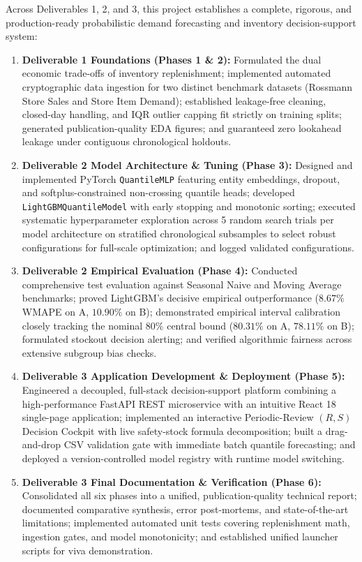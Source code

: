 \documentclass[11pt,a4paper]{article}
\begin{document}
Across Deliverables 1, 2, and 3, this project establishes a complete, rigorous, and production-ready probabilistic demand forecasting and inventory decision-support system:
\begin{enumerate}
    \item \textbf{Deliverable 1 Foundations (Phases 1 \& 2):} Formulated the dual economic trade-offs of inventory replenishment; implemented automated cryptographic data ingestion for two distinct benchmark datasets (Rossmann Store Sales and Store Item Demand); established leakage-free cleaning, closed-day handling, and IQR outlier capping fit strictly on training splits; generated publication-quality EDA figures; and guaranteed zero lookahead leakage under contiguous chronological holdouts.
    \item \textbf{Deliverable 2 Model Architecture \& Tuning (Phase 3):} Designed and implemented PyTorch \texttt{QuantileMLP} featuring entity embeddings, dropout, and softplus-constrained non-crossing quantile heads; developed \texttt{LightGBMQuantileModel} with early stopping and monotonic sorting; executed systematic hyperparameter exploration across 5 random search trials per model architecture on stratified chronological subsamples to select robust configurations for full-scale optimization; and logged validated configurations.
    \item \textbf{Deliverable 2 Empirical Evaluation (Phase 4):} Conducted comprehensive test evaluation against Seasonal Naive and Moving Average benchmarks; proved LightGBM's decisive empirical outperformance ($8.67\%$ WMAPE on A, $10.90\%$ on B); demonstrated empirical interval calibration closely tracking the nominal 80\% central bound ($80.31\%$ on A, $78.11\%$ on B); formulated stockout decision alerting; and verified algorithmic fairness across extensive subgroup bias checks.
    \item \textbf{Deliverable 3 Application Development \& Deployment (Phase 5):} Engineered a decoupled, full-stack decision-support platform combining a high-performance FastAPI REST microservice with an intuitive React 18 single-page application; implemented an interactive Periodic-Review $(R, S)$ Decision Cockpit with live safety-stock formula decomposition; built a drag-and-drop CSV validation gate with immediate batch quantile forecasting; and deployed a version-controlled model registry with runtime model switching.
    \item \textbf{Deliverable 3 Final Documentation \& Verification (Phase 6):} Consolidated all six phases into a unified, publication-quality technical report; documented comparative synthesis, error post-mortems, and state-of-the-art limitations; implemented automated unit tests covering replenishment math, ingestion gates, and model monotonicity; and established unified launcher scripts for viva demonstration.
\end{enumerate}
\end{document}
